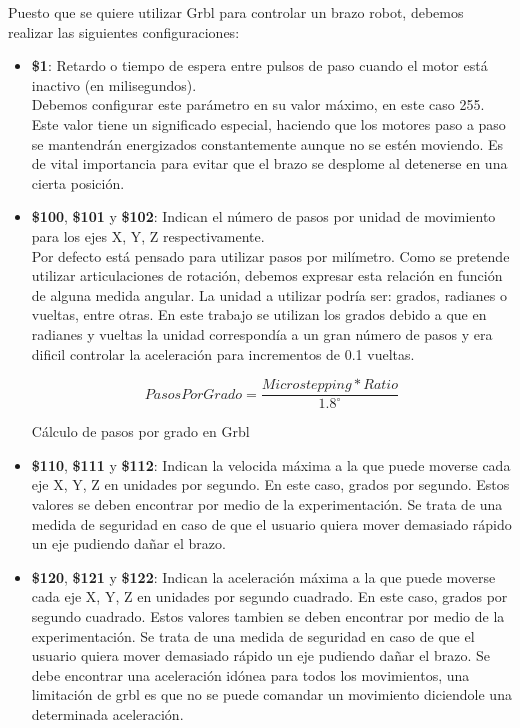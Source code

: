 Puesto que se quiere utilizar Grbl para controlar un brazo robot, debemos 
realizar las siguientes configuraciones:
\begin{itemize}
\item \textbf{\$1}: Retardo o tiempo de espera entre pulsos de paso cuando el motor está inactivo (en milisegundos). 
\\Debemos configurar 
este parámetro en su valor máximo, en este caso 255. Este valor tiene un significado especial, haciendo que los motores paso a paso 
se mantendrán energizados constantemente aunque no se estén moviendo. Es de vital importancia para evitar que el brazo se desplome al detenerse en una cierta posición.  
\item \textbf{\$100}, \textbf{\$101} y \textbf{\$102}: Indican el número de pasos por unidad de movimiento para los ejes X, Y, Z respectivamente. 
\\Por defecto está pensado para utilizar pasos por milímetro. Como se pretende utilizar articulaciones de rotación, debemos expresar esta relación 
en función de alguna medida angular. La unidad a utilizar podría ser: grados, radianes o vueltas, entre otras. En este trabajo se 
utilizan los grados debido a que en radianes y vueltas la unidad correspondía a un gran número de pasos y era dificil controlar la aceleración para incrementos de 
0.1 vueltas. 

\begin{myequation}[h!]
\begin{equation}
    PasosPorGrado = \frac{Microstepping * Ratio}{1.8^\circ}
\nonumber
\label{ec:pasos_por_grado}
\end{equation}
\caption[Cálculo de pasos por grado en Grbl]{Cálculo de pasos por grado en Grbl}
\end{myequation} 

\item \textbf{\$110}, \textbf{\$111} y \textbf{\$112}: Indican la velocida máxima a la que puede moverse cada eje X, Y, Z en unidades por segundo. 
En este caso, grados por segundo. Estos valores se deben encontrar por medio de la experimentación. Se trata de una medida de seguridad en 
caso de que el usuario quiera mover demasiado rápido un eje pudiendo dañar el brazo.

\item \textbf{\$120}, \textbf{\$121} y \textbf{\$122}: Indican la aceleración máxima a la que puede moverse cada eje X, Y, Z en unidades por segundo cuadrado. 
En este caso, grados por segundo cuadrado. Estos valores tambien se deben encontrar por medio de la experimentación. Se trata de una medida de seguridad en 
caso de que el usuario quiera mover demasiado rápido un eje pudiendo dañar el brazo. Se debe encontrar una aceleración idónea para todos 
los movimientos, una limitación de grbl es que no se puede comandar un movimiento diciendole una determinada aceleración.
\end{itemize}

